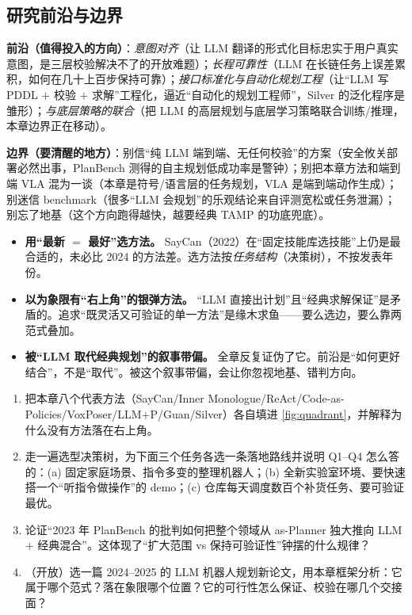 \subsection{研究前沿与边界}
\label{sec:map-frontier}

\textbf{前沿（值得投入的方向）}：\emph{意图对齐}（让 LLM 翻译的形式化目标忠实于用户真实意图，是三层校验解决不了的开放难题）；\emph{长程可靠性}（LLM 在长链任务上误差累积，如何在几十上百步保持可靠）；\emph{接口标准化与自动化规划工程}（让“LLM 写 PDDL $+$ 校验 $+$ 求解”工程化，逼近“自动化的规划工程师”，Silver 的泛化程序是雏形）；\emph{与底层策略的联合}（把 LLM 的高层规划与底层学习策略联合训练/推理，本章边界正在移动）。

\textbf{边界（要清醒的地方）}：别信“纯 LLM 端到端、无任何校验”的方案（安全攸关部署必然出事，PlanBench 测得的自主规划低成功率是警钟）；别把本章方法和端到端 VLA 混为一谈（本章是符号/语言层的任务规划，VLA 是端到端动作生成）；别迷信 benchmark（很多“LLM 会规划”的乐观结论来自评测宽松或任务泄漏）；别忘了地基（这个方向跑得越快，越要经典 TAMP 的功底兜底）。

\begin{pitfall}[本节常见陷阱]
\begin{itemize}
  \item \textbf{用“最新 $=$ 最好”选方法。} SayCan（2022）在“固定技能库选技能”上仍是最合适的，未必比 2024 的方法差。选方法按\emph{任务结构}（决策树），不按发表年份。
  \item \textbf{以为象限有“右上角”的银弹方法。} “LLM 直接出计划”且“经典求解保证”是矛盾的。追求“既灵活又可验证的单一方法”是缘木求鱼——要么选边，要么靠两范式叠加。
  \item \textbf{被“LLM 取代经典规划”的叙事带偏。} 全章反复证伪了它。前沿是“如何更好结合”，不是“取代”。被这个叙事带偏，会让你忽视地基、错判方向。
\end{itemize}
\end{pitfall}

\begin{exercise}
\begin{enumerate}
  \item 把本章八个代表方法（SayCan/Inner Monologue/ReAct/Code-as-Policies/VoxPoser/LLM+P/Guan/Silver）各自填进 \cref{fig:quadrant}，并解释为什么没有方法落在右上角。
  \item 走一遍选型决策树，为下面三个任务各选一条落地路线并说明 Q1--Q4 怎么答的：(a) 固定家庭场景、指令多变的整理机器人；(b) 全新实验室环境、要快速搭一个“听指令做操作”的 demo；(c) 仓库每天调度数百个补货任务、要可验证最优。
  \item 论证“2023 年 PlanBench 的批判如何把整个领域从 as-Planner 独大推向 LLM $+$ 经典混合”。这体现了“扩大范围 vs 保持可验证性”钟摆的什么规律？
  \item （开放）选一篇 2024--2025 的 LLM 机器人规划新论文，用本章框架分析：它属于哪个范式？落在象限哪个位置？它的可行性怎么保证、校验在哪几个交接面？
\end{enumerate}
\end{exercise}

